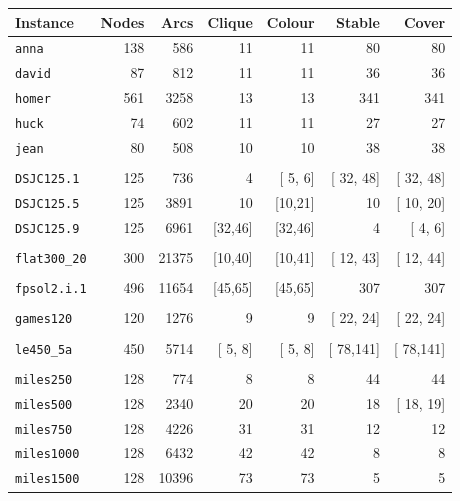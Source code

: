 \documentclass[a4paper,11pt,twoside]{book}
\begin{document}
\begin{multicols}{2}
\bigskip
\begin{center}
\small
\begin{tabular}{|lrrrrrr|}
\hline
{\bf Instance} & {\bf Nodes} & {\bf Arcs} & {\bf Clique} & {\bf Colour} & {\bf Stable} & {\bf Cover} \\
\hline
\hline
\verb/anna/      &   138 &     586 &         11  &         11  &          80  &          80 \\
\verb/david/     &    87 &     812 &         11  &         11  &          36  &          36 \\
\verb/homer/     &   561 &    3258 &         13  &         13  &         341  &         341 \\
\verb/huck/      &    74 &     602 &         11  &         11  &          27  &          27 \\
\verb/jean/      &    80 &     508 &         10  &         10  &          38  &          38 \\
&&&&&&\\
\verb/DSJC125.1/ &   125 &     736 &          4  &     [ 5, 6] &    [ 32, 48] &    [ 32, 48] \\
\verb/DSJC125.5/ &   125 &    3891 &         10  &     [10,21] &          10  &    [ 10, 20] \\
\verb/DSJC125.9/ &   125 &    6961 &     [32,46] &     [32,46] &           4  &    [  4,  6] \\
&&&&&&\\
\verb/flat300_20/&   300 &   21375 &     [10,40] &     [10,41] &    [ 12, 43] &    [ 12, 44] \\
&&&&&&\\
\verb/fpsol2.i.1/&   496 &   11654 &     [45,65] &     [45,65] &         307  &         307 \\
&&&&&&\\
\verb/games120/  &   120 &    1276 &          9  &          9  &    [ 22, 24] &    [ 22, 24] \\
&&&&&&\\
\verb/le450_5a/  &   450 &    5714 &     [ 5, 8] &     [ 5, 8] &    [ 78,141] &    [ 78,141] \\
&&&&&&\\
\verb/miles250/  &   128 &     774 &          8  &          8  &          44  &         44 \\
\verb/miles500/  &   128 &    2340 &         20  &         20  &          18  &  [ 18, 19] \\
\verb/miles750/  &   128 &    4226 &         31  &         31  &          12  &         12 \\
\verb/miles1000/ &   128 &    6432 &         42  &         42  &           8  &          8 \\
\verb/miles1500/ &   128 &   10396 &         73  &         73  &           5  &          5 \\
\hline
\end{tabular}
\end{center}


\end{multicols}
\end{document}
